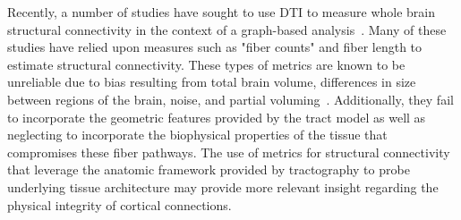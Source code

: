 Recently, a number of studies have sought to use DTI to measure whole brain structural connectivity in the context of a graph-based analysis~\cite{Honey2009,Hagmann2008,Hagmann2007,Sporns2005,Iturria-Medina2007}. Many of these studies have relied upon measures such as "fiber counts" and fiber length to estimate structural connectivity. These types of metrics are known to be unreliable due to bias resulting from total brain volume, differences in size between regions of the brain, noise, and partial voluming~\cite{Corouge2006}. Additionally, they fail to incorporate the geometric features provided by the tract model as well as neglecting to incorporate the biophysical properties of the tissue that compromises these fiber pathways. The use of metrics for structural connectivity that leverage the anatomic framework provided by tractography to probe underlying tissue architecture may provide more relevant insight regarding the physical integrity of cortical connections. 


